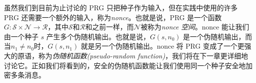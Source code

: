\begin{snote}[使用nonce。]
虽然我们到目前为止讨论的 PRG 只把种子作为输入，但在实践中使用的许多 PRG 还需要一个额外的输入，称为\emph{nonce}。也就是说，PRG 是一个函数 $G:\mathcal{S}\times\mathcal{N}\to\mathcal{R}$，其中$\mathcal{S}$和$\mathcal{R}$和之前一样，而$\mathcal{N}$被称为\emph{nonce 空间}。nonce 能让我们由一个种子 $s$ 产生多个伪随机输出。也就是说，$G(s,n_0)$ 是一个伪随机输出，而当$n_1\neq n_0$时，$G(s,n_1)$ 就是另一个伪随机输出。nonce 将 PRG 变成了一个更强大的原语，称为\emph{伪随机函数(pseudo-random function)}，我们将在下一章更详细地讨论它。正如我们将看到的，安全的伪随机函数能让我们使用同一个种子安全地加密多条消息。
\end{snote}